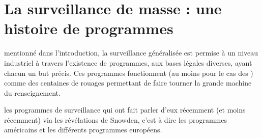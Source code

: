 
\chapter{La surveillance de masse : une histoire de programmes}
\label{ch:programmes}

\begin{doublespace}
\noindent\fontsize{18}{22}\selectfont\itshape
\nohyphenation
{}
\end{doublespace}

 mentionné dans l'introduction, la surveillance
généralisée est permise à un niveau industriel à travers l'existence de
programmes, aux bases légales diverses, ayant chacun un but précis. Ces
programmes fonctionnent (au moins pour le cas des \EUA) comme des centaines de
rouages permettant de faire tourner la grande machine du renseignement.

 les programmes de surveillance qui ont fait
parler d'eux récemment (et moins récemment) via les révélations de Snowden, c'est à dire les
programmes américains et les différents programmes européens.



\newpage

\newpage

\newpage





